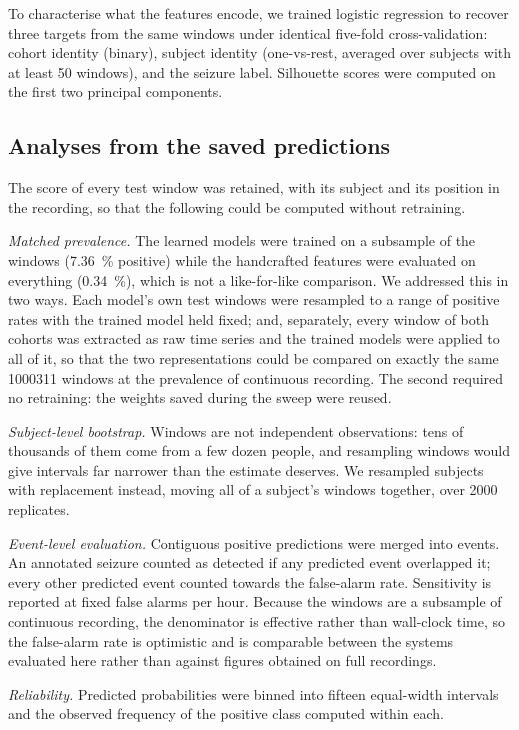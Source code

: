 \documentclass[11pt,a4paper]{article}
\begin{document}
To characterise what the features encode, we trained logistic regression to
recover three targets from the same windows under identical five-fold
cross-validation: cohort identity (binary), subject identity (one-vs-rest,
averaged over subjects with at least 50 windows), and the seizure label.
Silhouette scores were computed on the first two principal components.

\subsection{Analyses from the saved predictions}

The score of every test window was retained, with its subject and its
position in the recording, so that the following could be computed without
retraining.

\emph{Matched prevalence.} The learned models were trained on a subsample
of the windows (\SI{7.36}{\percent} positive) while the handcrafted features
were evaluated on everything (\SI{0.34}{\percent}), which is not a
like-for-like comparison. We addressed this in two ways. Each model's own
test windows were resampled to a range of positive rates with the trained
model held fixed; and, separately, every window of both cohorts was
extracted as raw time series and the trained models were applied to all of
it, so that the two representations could be compared on exactly the same
\num{1000311} windows at the prevalence of continuous recording. The second
required no retraining: the weights saved during the sweep were reused.

\emph{Subject-level bootstrap.} Windows are not independent observations:
tens of thousands of them come from a few dozen people, and resampling
windows would give intervals far narrower than the estimate deserves. We
resampled subjects with replacement instead, moving all of a subject's
windows together, over 2000 replicates.

\emph{Event-level evaluation.} Contiguous positive predictions were merged
into events. An annotated seizure counted as detected if any predicted event
overlapped it; every other predicted event counted towards the false-alarm
rate. Sensitivity is reported at fixed false alarms per hour. Because the
windows are a subsample of continuous recording, the denominator is
effective rather than wall-clock time, so the false-alarm rate is optimistic
and is comparable between the systems evaluated here rather than against
figures obtained on full recordings.

\emph{Reliability.} Predicted probabilities were binned into fifteen
equal-width intervals and the observed frequency of the positive class
computed within each.
\end{document}
